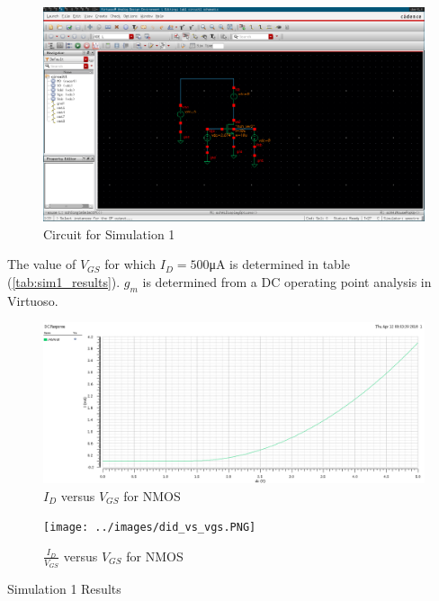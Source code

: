 \FloatBarrier

\begin{figure}[h!]
	\centering
	\includegraphics[scale=0.75]{../images/circuit1.PNG}
	\caption{Circuit for Simulation 1}
	\label{fig:circuit1}
\end{figure}

\FloatBarrier

The value of $V_{GS}$ for which $I_{D} = 500$\si{\micro\ampere} is determined in table (\ref{tab:sim1_results}).
$g_{m}$ is determined from a DC operating point analysis in Virtuoso.

\FloatBarrier

\begin{figure}[h!]
	\centering
	\includegraphics[scale=0.75]{../images/id_vs_vgs.PNG}
	\caption{$I_{D}$ versus $V_{GS}$ for NMOS}
	\label{fig:id_vs_vgs}
\end{figure}

\FloatBarrier

\FloatBarrier

\begin{figure}[h!]
	\centering
	\texttt{[image: ../images/did\_vs\_vgs.PNG]}
	\caption{$\frac{I_{D}}{V_{GS}}$ versus $V_{GS}$ for NMOS}
	\label{fig:did_vs_vgs}
\end{figure}

\FloatBarrier

\FloatBarrier

\begin{table}[h!]
	\centering
	\caption{Simulation 1 Results}
	\label{tab:sim1_results}
\end{table}

\FloatBarrier
